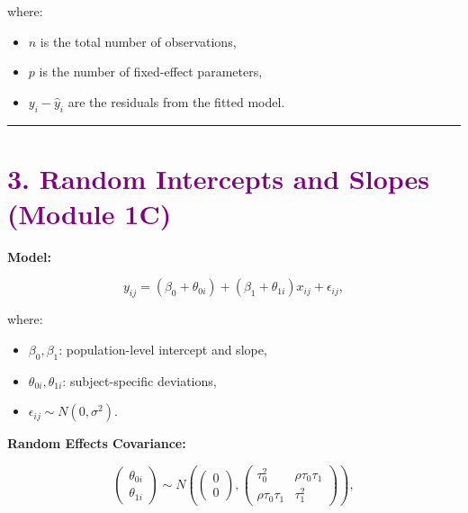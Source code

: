 \documentclass[
  letterpaper,
  DIV=11,
  numbers=noendperiod]{scrreprt}
\providecommand{\tightlist}{%
  \setlength{\itemsep}{0pt}\setlength{\parskip}{0pt}}\usepackage{longtable,booktabs,array}
\begin{document}
where:

\begin{itemize}
\tightlist
\item
  \(n\) is the total number of observations,
\item
  \(p\) is the number of fixed-effect parameters,
\item
  \(y_i - \hat{y}_i\) are the residuals from the fitted model.
\end{itemize}

\begin{center}\rule{0.5\linewidth}{0.5pt}\end{center}

\hypertarget{section-5}{%
\section*{\texorpdfstring{\textcolor{purple}{3. Random Intercepts and Slopes (Module 1C)}}{}}\label{section-5}}

\markright{\textcolor{purple}{3. Random Intercepts and Slopes (Module 1C)}}

\textbf{Model:}

\[
y_{ij} = (\beta_0 + \theta_{0i}) + (\beta_1 + \theta_{1i}) x_{ij} + \epsilon_{ij},
\]

where:

\begin{itemize}
\tightlist
\item
  \(\beta_0, \beta_1\): population-level intercept and slope,
\item
  \(\theta_{0i}, \theta_{1i}\): subject-specific deviations,
\item
  \(\epsilon_{ij} \sim N(0, \sigma^2)\).
\end{itemize}

\textbf{Random Effects Covariance:}

\[
\begin{pmatrix}
\theta_{0i} \\ \theta_{1i}
\end{pmatrix}
\sim N \left(
\begin{pmatrix} 0 \\ 0 \end{pmatrix},
\begin{pmatrix}
\tau_0^2 & \rho \tau_0 \tau_1 \\
\rho \tau_0 \tau_1 & \tau_1^2
\end{pmatrix}
\right),
\]
\end{document}
